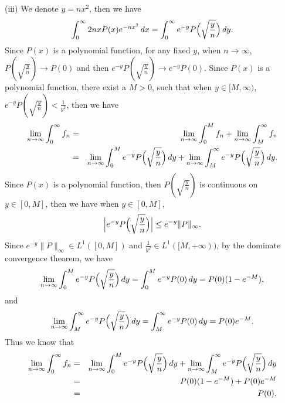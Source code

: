 \documentclass[12pt]{article}
\begin{document}
(iii) We denote $y = n x^{2}$, then we have
\begin{equation*}
    \int_{0}^{\infty} 2 n x P(x) e^{- n x^{2}} \, d x = \int_{0}^{\infty} e^{-y} P \Big{(} \sqrt{\frac{y}{n}} \Big{)} \, d y.
\end{equation*}
Since $P(x)$ is a polynomial function, for any fixed $y$, when $n \to \infty$, $P(\sqrt{\frac{y}{n}}) \to P(0)$ and then $e^{-y} P(\sqrt{\frac{y}{n}}) \to e^{-y} P(0)$. Since $P(x)$ is a polynomial function, there exist a $M > 0$, such that when $y \in [M, \infty)$, $e^{-y} P(\sqrt{\frac{y}{n}}) < \frac{1}{y^{2}}$, then we have
\begin{eqnarray*}
\lim_{n \to \infty} \int_{0}^{\infty} f_{n} & = & \lim_{n \to \infty} \int_{0}^{M} f_{n} + \lim_{n \to \infty} \int_{M}^{\infty} f_{n} \\
& = & \lim_{n \to \infty} \int_{0}^{M} e^{-y} P \Big{(} \sqrt{\frac{y}{n}} \Big{)} \, d y + \lim_{n \to \infty} \int_{M}^{\infty} e^{-y} P \Big{(} \sqrt{\frac{y}{n}} \Big{)} \, d y .
\end{eqnarray*}
Since $P(x)$ is a polynomial function, then $P(\sqrt{\frac{y}{n}})$ is continuous on $y \in [0,M]$, then we have when $y \in [0, M]$,
\begin{equation*}
    \Big{|} e^{-y} P \Big{(} \sqrt{\frac{y}{n}} \Big{)} \Big{|} \leq e^{-y} \|P\|_{\infty}.
\end{equation*}
Since $e^{-y} \|P\|_{\infty} \in L^{1}([0, M])$ and $\frac{1}{y^{2}} \in L^{1}([M, + \infty))$, by the dominate convergence theorem, we have
\begin{equation*}
    \lim_{n \to \infty} \int_{0}^{M} e^{-y} P \Big{(} \sqrt{\frac{y}{n}} \Big{)} \, d y = \int_{0}^{M} e^{-y} P(0) \, d y = P(0) (1 - e^{- M}),
\end{equation*}
and
\begin{equation*}
    \lim_{n \to \infty} \int_{M}^{\infty} e^{-y} P \Big{(} \sqrt{\frac{y}{n}} \Big{)} \, d y = \int_{M}^{\infty} e^{-y} P(0) \, d y = P(0) e^{- M}.
\end{equation*}
Thus we know that
\begin{eqnarray*}
\lim_{n \to \infty} \int_{0}^{\infty} f_{n} & = &  \lim_{n \to \infty} \int_{0}^{M} e^{-y} P \Big{(} \sqrt{\frac{y}{n}} \Big{)} \, d y + \lim_{n \to \infty} \int_{M}^{\infty} e^{-y} P \Big{(} \sqrt{\frac{y}{n}} \Big{)} \, d y \\
& = & P(0) (1 - e^{- M}) + P(0) e^{- M} \\
& = & P(0).
\end{eqnarray*}
\end{document}
